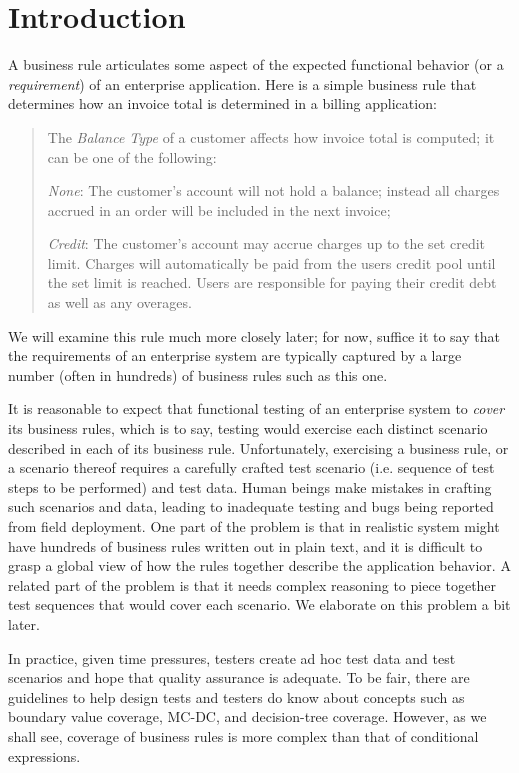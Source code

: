 \section{Introduction}

A business rule articulates some aspect of the expected functional behavior (or a \textit{requirement})
of an enterprise application. Here is a simple business rule that determines how an invoice total is 
determined in a billing application:

\begin{quote}
	The \textit{Balance Type} of a customer affects how invoice total is computed; it can be 
	one of the following:

	\textit{None}: The customer's account will not hold a balance; instead all charges accrued 
	in an order will be included in the next invoice;
	
	\textit{Credit}: The customer's account may accrue charges up to the set credit limit. 
	Charges will automatically be paid from the users credit pool until the set limit is reached. 
	Users are responsible for paying their credit debt as well as any overages.
\end{quote}	

We will examine this rule much more closely later; for now, suffice it to say that the requirements 
of an enterprise system are typically captured by a large number (often in hundreds) of business rules
such as this one.

It is reasonable to expect that functional testing of an enterprise system to \textit{cover} its 
business rules, which is to say, testing would exercise each distinct scenario described in each of
its business rule.  Unfortunately, exercising a business rule, or a scenario thereof requires a carefully
crafted test scenario (i.e. sequence of test steps to be performed) and test data.  Human beings
make mistakes in crafting such scenarios and data, leading to inadequate testing and bugs being
reported from field deployment.  One part of the problem is that in realistic system 
might have hundreds of business rules written out in plain text, and it is difficult to grasp
a global view of how the rules together describe the application behavior.  A related part of the 
problem is that it needs complex reasoning to piece together test sequences that would cover each 
scenario.  We elaborate on this problem a bit later.

In practice, given time pressures, testers create ad hoc test data and test scenarios and hope that
quality assurance is adequate.  To be fair, there are guidelines to help design tests and testers
do know about concepts such as boundary value coverage, MC-DC, and decision-tree coverage.  However, as 
we shall see, coverage of business rules is more complex than that of conditional expressions.

